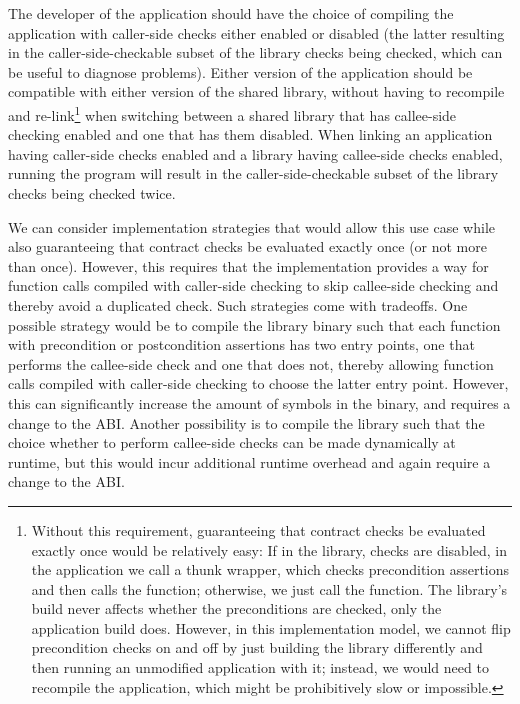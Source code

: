The developer of the application should have the choice of compiling the application with caller-side checks either enabled or disabled (the latter resulting in the caller-side-checkable subset of the library checks being checked, which can be useful to diagnose problems). Either version of the application should be compatible with either version of the shared library, without having to recompile and re-link\footnote{Without this requirement, guaranteeing that contract checks be evaluated exactly once would be relatively easy: If in the library, checks are disabled, in the application we call a thunk wrapper, which checks precondition assertions and then calls the function; otherwise, we just call the function. The library's build never affects whether the preconditions are checked, only the application build does. However, in this implementation model, we cannot flip precondition checks on and off by just building the library differently and then running an unmodified application with it; instead, we would need to recompile the application, which might be prohibitively slow or impossible.} when switching between a shared library that has callee-side checking enabled and one that has them disabled. When linking an application having caller-side checks enabled and a library having callee-side checks enabled, running the program will result in the caller-side-checkable subset of the library checks being checked twice.

We can consider implementation strategies that would allow this use case while also guaranteeing that contract checks be evaluated exactly once (or not more than once). However, this requires that the implementation provides a way for function calls compiled with caller-side checking to skip callee-side checking and thereby avoid a duplicated check. Such strategies come with tradeoffs. One possible strategy would be to compile the library binary such that each function with precondition or postcondition assertions has two entry points, one that performs the callee-side check and one that does not, thereby allowing function calls compiled with caller-side checking to choose the latter entry point. However, this can significantly increase the amount of symbols in the binary, and requires a change to the ABI. Another possibility is to compile the library such that the choice whether to perform callee-side checks can be made dynamically at runtime, but this would incur additional runtime overhead and again require a change to the ABI.

